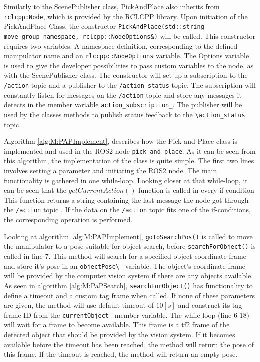 Similarly to the ScenePublisher class, PickAndPlace also inherits from \lstinline{rclcpp:Node}, which is provided by the RCLCPP library. Upon initiation of the PickAndPlace Class, the constructor \lstinline{PickAndPlace(std::string move_group_namespace, rclcpp::NodeOptions&)} will be called. This constructor requires two variables. A namespace definition, corresponding to the defined manipulator name and an \lstinline{rlccpp::NodeOptions} variable. The Options variable is used to give the developer possibilities to pass custom variables to the node, as with the ScenePublisher class.
The constructor will set up a subscription to the \lstinline{/action} topic and a publisher to the \lstinline{/action_status} topic. The subscription will constantly listen for messages on the \lstinline{/action} topic and store any messages it detects in the member variable \lstinline{action_subscription_}. The publisher will be used by the classes methods to publish status feedback to the \lstinline{\action_status} topic.

Algorithm \ref{alg:M:PAPImplement}, describes how the Pick and Place class is implemented and used in the ROS2 node \lstinline{pick_and_place}. As it can be seen from this algorithm, the implementation of the class is quite simple. The first two lines involves setting a parameter and initiating the ROS2 node. The main functionality is gathered in one while-loop. Looking closer at that while-loop, it can be seen that the $getCurrentAction()$ function is called in every if-condition This function  returns a string containing the last message the node got through the \lstinline{/action} topic . If the data on the \lstinline{/action} topic fits one of the if-conditions, the corresponding operation is performed.



Looking at algorithm \ref{alg:M:PAPImplement}, \lstinline{goToSearchPos()} is called to move the manipulator to a pose suitable for object search, before \lstinline{searchForObject()} is called in line 7. This method will search for a specified object coordinate frame and store it's pose in an \lstinline{objectPose\_} variable. The object's coordinate frame will be provided by the computer vision system if there are any objects available. As seen in algorithm \ref{alg:M:PaPSearch}, \lstinline{searchForObject()} has functionality to define a timeout and a custom tag frame when called. If none of these parameters are given, the method will use default timeout of $10[s]$ and construct its tag frame ID from the \lstinline{currentObject_} member variable. The while loop (line 6-18) will wait for a frame to become available. This frame is a tf2 frame of the detected object that should be provided by the vision system. If it becomes available before the timeout has been reached, the method will return the pose of this frame. If the timeout is reached, the method will return an empty pose.


